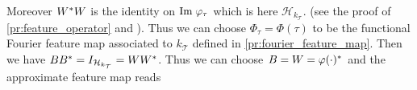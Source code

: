 Moreover $W^* W$ is the identity on
$\Ima \Phi_{\tau}$ which is here $\mathcal{H}_{k_{\mathcal{T}}}$. (see the
proof of \cref{pr:feature_operator} and \citet{Carmeli2010}). Thus we can
choose $\Phi_\tau=\Phi(\tau)$ to be the functional Fourier feature map
associated to $k_{\mathcal{T}}$ defined in \cref{pr:fourier_feature_map}.  Then
we have $BB^* = I_{\mathcal{H}_{k_{\mathcal{T}}}} = W W^*$.  Thus
we can choose $B = W = \Phi(\cdot)^\adjoint$ and the approximate
feature map reads
